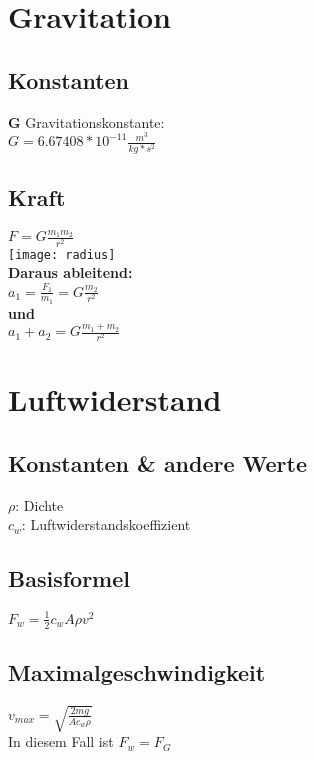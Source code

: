 \documentclass[10pt,a4paper]{article}
\title{\titleText}
\author{\authorText}
\date{\dateText}
\begin{document}
	\begin{multicols}{3}
		\section{Gravitation}
		\subsection{Konstanten}
		\textbf{G} Gravitationskonstante:\\
		\(G=6.67408*10^{-11}\frac{m^3}{kg*s^2} \)
		\subsection{Kraft}
		\(F=G\frac{m_1 m_2}{r^2} \)\\
		\texttt{[image: radius]}\\
		\textbf{Daraus ableitend:}\\
		\(a_1 = \frac{F_1}{m_1}=G\frac{m_2}{r^2} \)\\
		\textbf{und}\\
		\(a_1 + a_2 = G\frac{m_1 + m_2}{r^2}\)\\
		\section{Luftwiderstand}
		\subsection{Konstanten \& andere Werte}
		\(\rho\): Dichte\\
		\(c_w\): Luftwiderstandskoeffizient
		\subsection{Basisformel}
		\( F_w = \frac{1}{2} c_w A  \rho v^2 \)
		\subsection{Maximalgeschwindigkeit}
		\(v_{max} = \sqrt{\frac{2mg}{Ac_w\rho}} \)\\
		In diesem Fall ist \(F_w = F_G\)
	\end{multicols}
\end{document}
